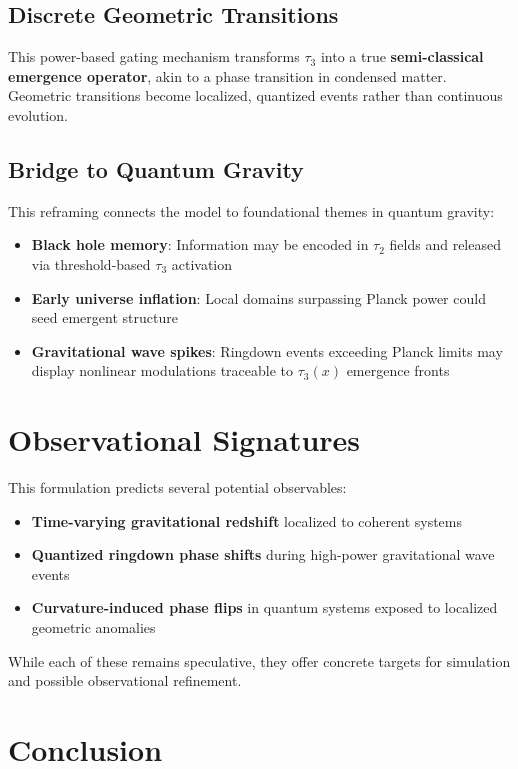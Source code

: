 \documentclass[12pt]{article}
\begin{document}
\subsection{Discrete Geometric Transitions}
This power-based gating mechanism transforms $\tau_3$ into a true \textbf{semi-classical emergence operator}, akin to a phase transition in condensed matter. Geometric transitions become localized, quantized events rather than continuous evolution.

\subsection{Bridge to Quantum Gravity}
This reframing connects the model to foundational themes in quantum gravity:
\begin{itemize}
    \item \textbf{Black hole memory}: Information may be encoded in $\tau_2$ fields and released via threshold-based $\tau_3$ activation
    \item \textbf{Early universe inflation}: Local domains surpassing Planck power could seed emergent structure
    \item \textbf{Gravitational wave spikes}: Ringdown events exceeding Planck limits may display nonlinear modulations traceable to $\tau_3(x)$ emergence fronts
\end{itemize}

\section{Observational Signatures}

This formulation predicts several potential observables:
\begin{itemize}
    \item \textbf{Time-varying gravitational redshift} localized to coherent systems
    \item \textbf{Quantized ringdown phase shifts} during high-power gravitational wave events
    \item \textbf{Curvature-induced phase flips} in quantum systems exposed to localized geometric anomalies
\end{itemize}

While each of these remains speculative, they offer concrete targets for simulation and possible observational refinement.

\section{Conclusion}
\end{document}
